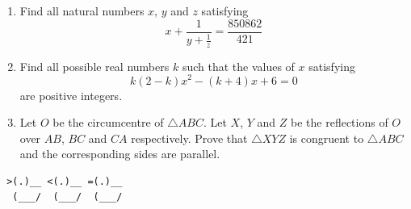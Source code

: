 \documentclass{article}
\begin{document}
\begin{enumerate}[1.]
\item %
Find all natural numbers $x$, $y$ and $z$ satisfying 
$$x + \frac{1}{y + \frac{1}{z}} = \frac{850862}{421}$$


\item %
Find all possible real numbers $k$ such that the values of $x$ satisfying
$$k(2 - k)x^2 - (k + 4)x + 6 = 0$$
are positive integers.


\item %
Let $O$ be the circumcentre of $\triangle ABC$. Let $X$, $Y$ and $Z$ be the reflections of $O$ over $AB$, $BC$ and $CA$ respectively. Prove that $\triangle XYZ$ is congruent to $\triangle ABC$ and the corresponding sides are parallel.



\end{enumerate}


\vfill
\centering
\begin{BVerbatim}
 >(.)__ <(.)__ =(.)__
  (___/  (___/  (___/ 
\end{BVerbatim}
\end{document}
